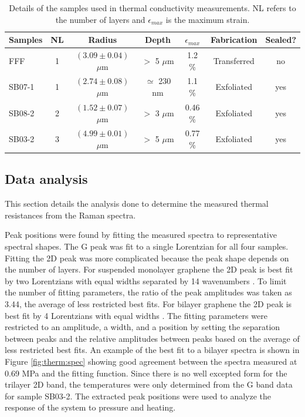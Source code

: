 \begin{table}
	\begin{center}
	\begin{tabular}{l c c c c c c}
		\hline
		\hline
		Samples & NL 	& Radius 					& Depth 		& $\epsilon_{max}$ & Fabrication 		& Sealed? \\
		\hline
		FFF		& 1 	& $(3.09 \pm 0.04)$ $\mu$m 	& $>$ 5 $\mu$m 	& 1.2 \%	& Transferred 	 	& no \\
		SB07-1	& 1 	& $(2.74 \pm 0.08)$ $\mu$m 	& $\simeq$ 230 nm & 1.1 \%	& Exfoliated 		& yes \\
		SB08-2	& 2 	& $(1.52 \pm 0.07)$ $\mu$m 	& $>$ 3 $\mu$m 	& 0.46 \%	& Exfoliated 		& yes \\
		SB03-2	& 3 	& $(4.99 \pm 0.01)$ $\mu$m 	& $>$ 5 $\mu$m 	& 0.77 \%	& Exfoliated 		& yes \\
		\hline
		\hline
	\end{tabular}
	\end{center}
	\caption[Samples used in thermal conductivity measurements]{\label{tab:therm:samples} 
	Details of the samples used in thermal conductivity measurements. NL refers to the number of layers and $\epsilon_{max}$ is the maximum strain.}
\end{table}

\subsection{Data analysis}
This section details the analysis done to determine the measured thermal resistances from the Raman spectra.

Peak positions were found by fitting the measured spectra to representative spectral shapes.
The G peak was fit to a single Lorentzian for all four samples.
Fitting the 2D peak was more complicated because the peak shape depends on the number of layers.
For suspended monolayer graphene the 2D peak is best fit by two Lorentzians with equal widths separated by 14 wavenumbers \cite{Berciaud2013}.
To limit the number of fitting parameters, the ratio of the peak amplitudes was taken as 3.44, the average of less restricted best fits.
For bilayer graphene the 2D peak is best fit by 4 Lorentzians with equal widths \cite{Ferrari2006,Malard2007}.
The fitting parameters were restricted to an amplitude, a width, and a position by setting the separation between peaks and the relative amplitudes between peaks based on the average of less restricted best fits.
An example of the best fit to a bilayer spectra is shown in Figure \ref{fig:therm:spec} showing good agreement between the spectra measured at 0.69 MPa and the fitting function.
Since there is no well excepted form for the trilayer 2D band, the temperatures were only determined from the G band data for sample SB03-2.
The extracted peak positions were used to analyze the response of the system to pressure and heating.

